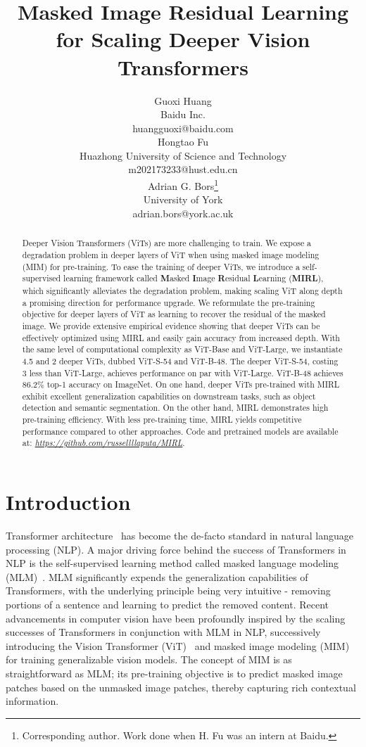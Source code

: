 \documentclass{article}
\title{Masked Image Residual Learning for Scaling Deeper Vision Transformers}
\author{Guoxi Huang \\
  \small Baidu Inc.\\
  \small{huangguoxi@baidu.com} \\
  \And
  Hongtao Fu \\
  \small Huazhong University of Science and Technology \\
  \small{m202173233@hust.edu.cn} \\
  \And
  Adrian G. Bors\thanks{Corresponding author. Work done when H. Fu was an intern at Baidu.}\\
  \small University of York \\
  \small{adrian.bors@york.ac.uk} \\
}
\begin{document}
\maketitle


\begin{abstract}
Deeper Vision Transformers (ViTs) are more challenging to train. We expose a degradation problem in deeper layers of ViT when using masked image modeling (MIM) for pre-training.
To ease the training of deeper ViTs, we introduce a self-supervised learning framework called \textbf{M}asked \textbf{I}mage \textbf{R}esidual \textbf{L}earning (\textbf{MIRL}), which significantly alleviates the degradation problem, making scaling ViT along depth a promising direction for performance upgrade. We reformulate the pre-training objective for deeper layers of ViT as learning to recover the residual of the masked image.
We provide extensive empirical evidence showing that deeper ViTs can be effectively optimized using MIRL and easily gain accuracy from increased depth. 
With the same level of computational complexity as ViT-Base and ViT-Large, we instantiate 4.5{} and 2{} deeper ViTs, dubbed ViT-S-54 and ViT-B-48.
The deeper ViT-S-54, costing 3{} less than ViT-Large, achieves performance on par with ViT-Large.
ViT-B-48 achieves 86.2\% top-1 accuracy on ImageNet. 
On one hand, deeper ViTs pre-trained with MIRL exhibit excellent generalization capabilities on downstream tasks, such as object detection and semantic segmentation. On the other hand, MIRL demonstrates high pre-training efficiency. With less pre-training time, MIRL yields competitive performance compared to other approaches. Code and pretrained models are
available at: \href{https://github.com/russellllaputa/MIRL}{\textit{https://github.com/russellllaputa/MIRL}}.


\end{abstract}

    

\section{Introduction}


Transformer architecture~\cite{vaswani2017attention} has become the de-facto standard in natural language processing (NLP). 
A major driving force behind the success of Transformers in NLP is the self-supervised learning method called masked language modeling (MLM)~\cite{devlin2019bert}. 
MLM significantly expends the generalization capabilities of Transformers, with the underlying principle being very intuitive - removing portions of a sentence and learning to predict the removed content.
Recent advancements in computer vision have been profoundly inspired by the scaling successes of Transformers in conjunction with MLM in NLP, successively introducing the Vision Transformer (ViT)~\cite{dosovitskiy2020image} and masked image modeling (MIM) for training generalizable vision models.
The concept of MIM is as straightforward as MLM; its pre-training objective is to predict masked image patches based on the unmasked image patches, thereby capturing rich contextual information. 
\end{document}
